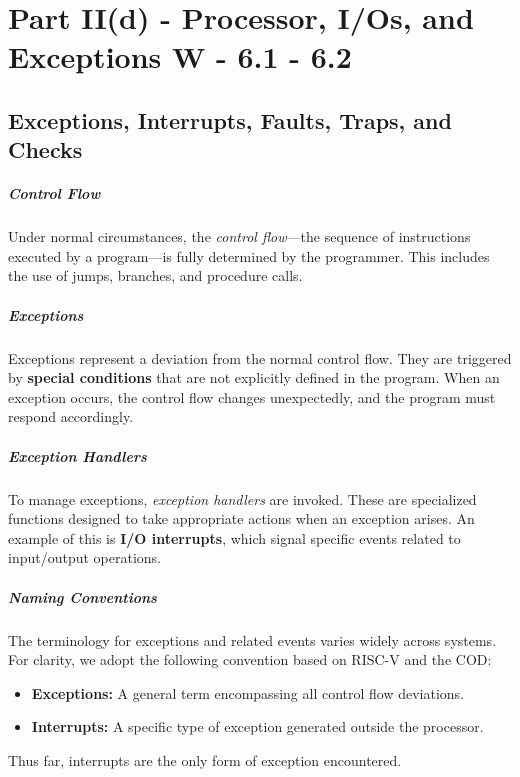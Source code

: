\chapter{Part II(d) - Processor, I/Os, and Exceptions W - 6.1 - 6.2}

\section{Exceptions, Interrupts, Faults, Traps, and Checks}

\paragraph{Control Flow}
Under normal circumstances, the \textit{control flow}—the sequence of instructions executed by a program—is fully determined by the programmer. This includes the use of jumps, branches, and procedure calls.

\paragraph{Exceptions}
Exceptions represent a deviation from the normal control flow. They are triggered by \textbf{special conditions} that are not explicitly defined in the program. When an exception occurs, the control flow changes unexpectedly, and the program must respond accordingly.

\paragraph{Exception Handlers}
To manage exceptions, \textit{exception handlers} are invoked. These are specialized functions designed to take appropriate actions when an exception arises. An example of this is \textbf{I/O interrupts}, which signal specific events related to input/output operations.

\paragraph{Naming Conventions}
The terminology for exceptions and related events varies widely across systems. For clarity, we adopt the following convention based on RISC-V and the COD:
\begin{itemize}
    \item \textbf{Exceptions:} A general term encompassing all control flow deviations.
    \item \textbf{Interrupts:} A specific type of exception generated outside the processor.
\end{itemize}
Thus far, interrupts are the only form of exception encountered.


